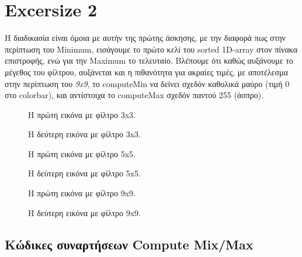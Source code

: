 \documentclass[11pt]{scrartcl} %
\begin{document}
\clearpage
\section{Excersize 2}

Η διαδικασία είναι όμοια με αυτήν της πρώτης άσκησης, με την διαφορά πως στην περίπτωση του Minimum, εισάγουμε το πρώτο κελί του sorted 1D-array
στον πίνακα επιστροφής, ενώ για την Maximum το τελευταίο. Βλέπουμε ότι καθώς αυξάνουμε το μέγεθος του φίλτρου, αυξάνεται και η πιθανότητα για ακραίες
τιμές, με αποτέλεσμα στην περίπτωση του \textit{9x9}, το computeMin να δείνει σχεδόν καθολικά μαύρο (τιμή 0 στο colorbar), και αντίστοιχα
το computeMax σχεδόν παντού 255 (άσπρο).

\begin{figure}[h]
    \centering
    \caption{Η πρώτη εικόνα με φίλτρο 3x3.}
\end{figure}
\begin{figure}[h]
    \centering
    \caption{Η δεύτερη εικόνα με φίλτρο 3x3.}
\end{figure}


\begin{figure}[h]
    \centering
    \caption{Η πρώτη εικόνα με φίλτρο 5x5.}
\end{figure}
\begin{figure}[h]
    \centering
    \caption{Η δεύτερη εικόνα με φίλτρο 5x5.}
\end{figure}

\begin{figure}[h]
    \centering
    \caption{Η πρώτη εικόνα με φίλτρο 9x9.}
\end{figure}

\begin{figure}[h]
    \centering
    \caption{Η δεύτερη εικόνα με φίλτρο 9x9.}
\end{figure}

\clearpage
\subsection*{Κώδικες συναρτήσεων Compute Mix/Max}
\end{document}
